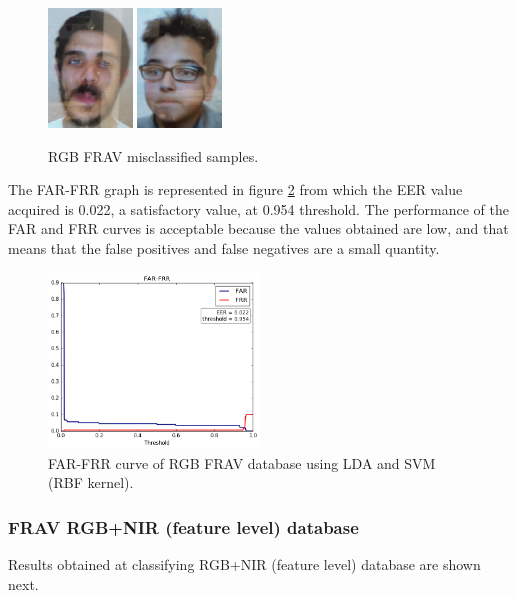 \begin{figure}[htb]
\centering
\includegraphics[width=0.2\textwidth]{images_databases/frav_tablet_109.JPG}
\includegraphics[width=0.2\textwidth]{images_databases/frav_tablet_162.JPG}
\caption{RGB FRAV misclassified samples.} \label{fig:frav_miscl}
\end{figure}

The FAR-FRR graph is represented in figure \ref{fig:RGB_FRAV_FAR_FRR} from which the EER value acquired is 0.022, a satisfactory value, at 0.954 threshold. The performance of the FAR and FRR curves is acceptable because the values obtained are low, and that means that the false positives and false negatives are a small quantity.

\begin{figure}[htb]
\centering
\includegraphics[width=0.5\textwidth]{images/FAR-FRR/FRAV_LDA_SVM_RBF_FAR_FRR.png}
\caption{FAR-FRR curve of RGB FRAV database using LDA and SVM (RBF kernel).} \label{fig:RGB_FRAV_FAR_FRR}
\end{figure}


\subsubsection{FRAV RGB+NIR (feature level) database}
Results obtained at classifying RGB+NIR (feature level) database are shown next.\\

